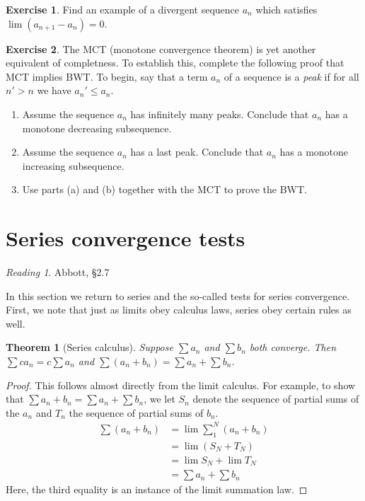 \documentclass[11pt,oneside]{amsbook}
\theoremstyle{definition}
\newtheorem{exerc}{Exercise}[section]
\theoremstyle{plain}
\newtheorem{thm}{Theorem}[section]
\theoremstyle{definition}
\theoremstyle{remark}
\newtheorem*{reading}{Reading}
\numberwithin{equation}{section}
\numberwithin{figure}{section}
\begin{document}
\begin{exerc}
  Find an example of a divergent sequence $a_n$ which satisfies $\lim(a_{n+1}-a_n)=0$.
\end{exerc}

\begin{exerc}
  The MCT (monotone convergence theorem) is yet another equivalent of completness. To establish this, complete the following proof that MCT implies BWT. To begin, say that a term $a_n$ of a sequence is a \emph{peak} if for all $n'>n$ we have $a_n'\leq a_n$.
  \begin{enumerate}
    \item Assume the sequence $a_n$ has infinitely many peaks. Conclude that $a_n$ has a monotone decreasing subsequence.
    \item Assume the sequence $a_n$ has a last peak. Conclude that $a_n$ has a monotone increasing subsequence.
    \item Use parts (a) and (b) together with the MCT to prove the BWT.
  \end{enumerate}
\end{exerc}

\newpage
\section{Series convergence tests}

\begin{reading}
  Abbott, \S 2.7
\end{reading}

In this section we return to series and the so-called tests for series convergence. First, we note that just as limits obey calculus laws, series obey certain rules as well.

\begin{thm}[Series calculus]
  Suppose $\sum a_n$ and $\sum b_n$ both converge. Then $\sum ca_n=c\sum a_n$ and $\sum(a_n+b_n)=\sum a_n+\sum b_n$.
\end{thm}

\begin{proof}
  This follows almost directly from the limit calculus. For example, to show that $\sum a_n+b_n=\sum a_n+\sum b_n$, we let $S_n$ denote the sequence of partial sums of the $a_n$ and $T_n$ the sequence of partial sums of $b_n$.
  \begin{align*}
    \sum(a_n+b_n)&=\lim\sum_1^N(a_n+b_n)\\
                &=\lim (S_N+T_N)\\
                &=\lim S_N+\lim T_N\\
                &=\sum a_n+\sum b_n
  \end{align*}
  Here, the third equality is an instance of the limit summation law.
\end{proof}
\end{document}
